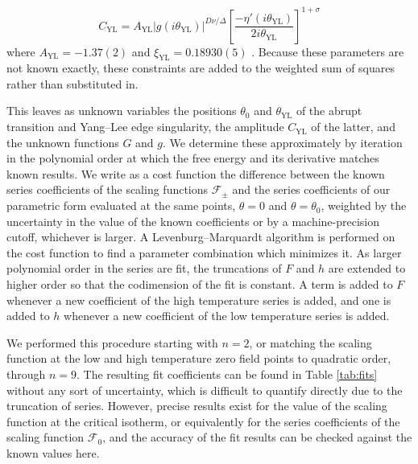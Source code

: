 \documentclass[
aps,
pre,
preprint,
longbibliography,
floatfix
]{revtex4-2}
\begin{document}
\begin{equation}
  C_\mathrm{YL}=A_\mathrm{YL}|g(i\theta_\mathrm{YL})|^{D\nu/\Delta}\left[\frac{-\eta'(i\theta_\mathrm{YL})}{2i\theta_\mathrm{YL}}\right]^{1+\sigma}
\end{equation}
where $A_\mathrm{YL}=-1.37(2)$ and $\xi_\mathrm{YL}=0.18930(5)$
\cite{Fonseca_2003_Ising}. Because these parameters are not known exactly,
these constraints are added to the weighted sum of squares rather than
substituted in.

This leaves as unknown variables the positions $\theta_0$ and
$\theta_{\mathrm{YL}}$ of the abrupt transition and Yang--Lee edge singularity,
the amplitude $C_\mathrm{YL}$ of the latter, and the unknown functions $G$ and
$g$. We determine these approximately by iteration in the polynomial order at
which the free energy and its derivative matches known results. We write as a
cost function the difference between the known series coefficients of the
scaling functions $\mathcal F_\pm$ and the series coefficients of our
parametric form evaluated at the same points, $\theta=0$ and $\theta=\theta_0$,
weighted by the uncertainty in the value of the known coefficients or by a
machine-precision cutoff, whichever is larger. A Levenburg--Marquardt algorithm
is performed on the cost function to find a parameter combination which
minimizes it. As larger polynomial order in the series are fit, the truncations
of $F$ and $h$ are extended to higher order so that the codimension of the fit
is constant. A term is added to $F$ whenever a new coefficient of the high
temperature series is added, and one is added to $h$ whenever a new coefficient
of the low temperature series is added.

We performed this procedure starting with $n=2$, or matching the scaling
function at the low and high temperature zero field points to quadratic order,
through $n=9$. The resulting fit coefficients can be found in Table
\ref{tab:fits} without any sort of uncertainty, which is difficult to quantify
directly due to the truncation of series. However, precise results exist for
the value of the scaling function at the critical isotherm, or equivalently for
the series coefficients of the scaling function $\mathcal F_0$, and the
accuracy of the fit results can be checked against the known values here.
\end{document}
